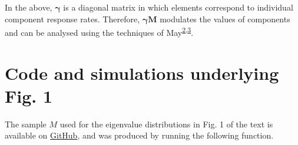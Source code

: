 \documentclass[]{article}
\begin{document}
In the above, \(\mathbf{\gamma}\) is a diagonal matrix in which elements
correspond to individual component response rates. Therefore,
\(\mathbf{\gamma} \mathbf{M}\) modulates the values of components and
can be analysed using the techniques of
May\textsuperscript{\protect\hyperlink{ref-May1972}{2},\protect\hyperlink{ref-May1973}{3}}.

\hypertarget{Fig1}{\section{Code and simulations underlying Fig.
1}\label{Fig1}}

The sample \(M\) used for the eigenvalue distributions in Fig. 1 of the
text is available on
\href{https://github.com/bradduthie/RandomMatrixStability/tree/master/sim_results/bi_gamma}{GitHub},
and was produced by running the following function.
\end{document}
